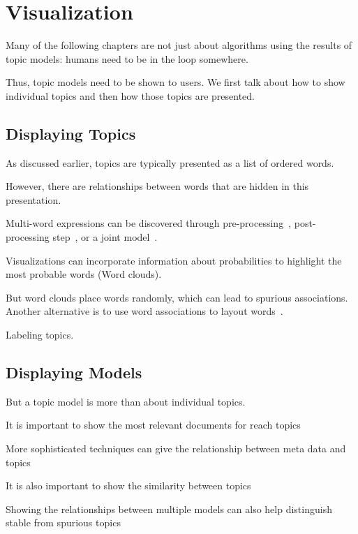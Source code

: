 

\chapter{Visualization}
\label{ch:viz}

Many of the following chapters are not just about algorithms using the
results of topic models: humans need to be in the loop somewhere.

Thus, topic models need to be shown to users.  We first talk about how
to show individual topics and then how those topics are presented.

\section{Displaying Topics}
\label{sec:display}

As discussed earlier, topics are typically presented as a list of
ordered words.

However, there are relationships between words that are hidden in this
presentation.

Multi-word expressions can be discovered through
pre-processing~\citep{talley-11}, post-processing step~\citep{blei-09b},
or a joint model~\citep{johnson-10}.

Visualizations can incorporate information about probabilities to
highlight the most probable words (Word clouds).

But word clouds place words randomly, which can lead to spurious
associations.  Another alternative is to use word associations to
layout words~\citep{Smith:Chuang:Hu:Boyd-Graber:Findlater-2014}.

Labeling topics.

\section{Displaying Models}

But a topic model is more than about individual topics.

It is important to show the most relevant documents for reach
topics~\citep{chaney-12}

More sophisticated techniques can give the relationship between meta
data and topics~\citep{gardner-10,eistenstein-14}

It is also important to show the similarity between
topics~\citep{chuang-12}

Showing the relationships between multiple models can also help
distinguish stable from spurious topics~\citep{chuang-15}

